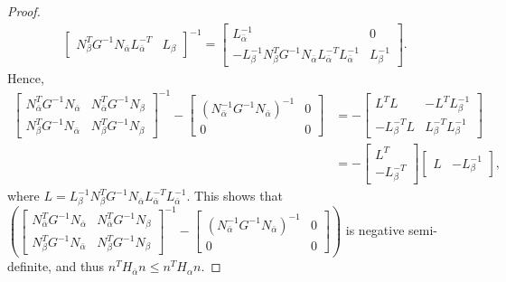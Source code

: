 \documentclass{article}
\begin{document}
\begin{proof}
\begin{align*}
\begin{bmatrix}
				N_{\beta}^{T}G^{-1}N_{\bar{\alpha}}L_{\bar{\alpha}}^{-T} & L_{\beta}
			\end{bmatrix}^{-1} = \begin{bmatrix}
				L_{\bar{\alpha}}^{-1} & 0\\
				-L_{\beta}^{-1}N_{\beta}^{T}G^{-1}N_{\bar{\alpha}}L_{\bar{\alpha}}^{-T}L_{\bar{\alpha}}^{-1} & L_{\beta}^{-1}
			\end{bmatrix}.
		\end{align*}
		Hence,
		\begin{align*}
			\begin{bmatrix}
				N_{\bar{\alpha}}^{T}G^{-1}N_{\bar{\alpha}} & N_{\bar{\alpha}}^{T}G^{-1}N_{\beta}\\
				N_{\beta}^{T}G^{-1}N_{\bar{\alpha}} & N_{\beta}^{T}G^{-1}N_{\beta}
			\end{bmatrix}^{-1} - \begin{bmatrix}
				(N_{\bar{\alpha}}^{-1}G^{-1}N_{\bar{\alpha}})^{-1} & 0\\
				0 & 0
			\end{bmatrix} & = -\begin{bmatrix}
				L^{T}L & -L^{T}L_{\beta}^{-1}\\
				-L_{\beta}^{-T}L & L_{\beta}^{-T}L_{\beta}^{-1}
			\end{bmatrix}\\
			& = -\begin{bmatrix}
				L^{T}\\
				-L_{\beta}^{-T}
			\end{bmatrix} \begin{bmatrix}
				L & -L_{\beta}^{-1}
			\end{bmatrix},
		\end{align*}
		where $L = L_{\beta}^{-1}N_{\beta}^{T}G^{-1}N_{\bar{\alpha}}L_{\bar{\alpha}}^{-T}L_{\bar{\alpha}}^{-1}$. This shows that $ \left(\begin{bmatrix}
			N_{\bar{\alpha}}^{T}G^{-1}N_{\bar{\alpha}} & N_{\bar{\alpha}}^{T}G^{-1}N_{\beta}\\
			N_{\beta}^{T}G^{-1}N_{\bar{\alpha}} & N_{\beta}^{T}G^{-1}N_{\beta}
		\end{bmatrix}^{-1} - \begin{bmatrix}
			(N_{\bar{\alpha}}^{-1}G^{-1}N_{\bar{\alpha}})^{-1} & 0\\
			0 & 0
		\end{bmatrix}\right)$ is negative semi-definite, and thus $n^{T}H_{\bar{\alpha}}n \leq n^{T}H_{\alpha}n$.
		

\end{proof}
\end{document}
